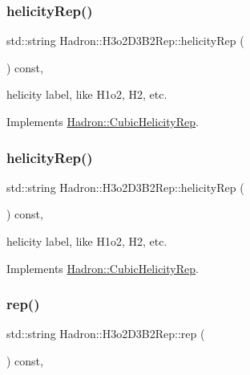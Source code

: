 \subsubsection{\texorpdfstring{helicityRep()}{helicityRep()}\hspace{0.1cm}{\footnotesize\ttfamily [2/3]}}
{\footnotesize\ttfamily std\+::string Hadron\+::\+H3o2\+D3\+B2\+Rep\+::helicity\+Rep (\begin{DoxyParamCaption}{ }\end{DoxyParamCaption}) const\hspace{0.3cm}{\ttfamily [inline]}, {\ttfamily [virtual]}}

helicity label, like H1o2, H2, etc. 

Implements \mbox{\hyperlink{structHadron_1_1CubicHelicityRep_af1096946b7470edf0a55451cc662f231}{Hadron\+::\+Cubic\+Helicity\+Rep}}.

\mbox{\label{structHadron_1_1H3o2D3B2Rep_aba53f298e71b3e22d5828f164c2127cc}} 
\subsubsection{\texorpdfstring{helicityRep()}{helicityRep()}\hspace{0.1cm}{\footnotesize\ttfamily [3/3]}}
{\footnotesize\ttfamily std\+::string Hadron\+::\+H3o2\+D3\+B2\+Rep\+::helicity\+Rep (\begin{DoxyParamCaption}{ }\end{DoxyParamCaption}) const\hspace{0.3cm}{\ttfamily [inline]}, {\ttfamily [virtual]}}

helicity label, like H1o2, H2, etc. 

Implements \mbox{\hyperlink{structHadron_1_1CubicHelicityRep_af1096946b7470edf0a55451cc662f231}{Hadron\+::\+Cubic\+Helicity\+Rep}}.

\mbox{\label{structHadron_1_1H3o2D3B2Rep_a7b7bbc5fa5a2e13412b53abb425dc0fd}} 
\subsubsection{\texorpdfstring{rep()}{rep()}\hspace{0.1cm}{\footnotesize\ttfamily [1/5]}}
{\footnotesize\ttfamily std\+::string Hadron\+::\+H3o2\+D3\+B2\+Rep\+::rep (\begin{DoxyParamCaption}{ }\end{DoxyParamCaption}) const\hspace{0.3cm}{\ttfamily [inline]}, {\ttfamily [virtual]}}



